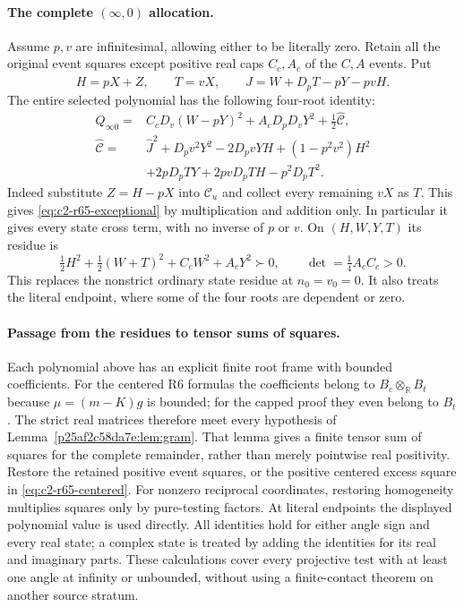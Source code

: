 \paragraph{The complete $(\infty,0)$ allocation.}
Assume $p,v$ are infinitesimal, allowing either to be literally zero.
Retain all the original event squares except positive real caps
$C_c,A_c$ of the $C,A$ events. Put
\[
 H=pX+Z,\qquad T=vX,\qquad
 \widehat J=W+D_pT-pY-pvH.
\]
The entire selected polynomial has the following four-root identity:
\begin{equation}\label{eq:c2-r65-exceptional}
\begin{split}
 Q_{\infty0}={}&C_cD_v(W-pY)^2+A_cD_pD_vY^2
                      +\tfrac12\widehat{\mathcal C},\\
 \widehat{\mathcal C}={}&\widehat J^2+D_pv^2Y^2-2D_pvYH
          +(1-p^2v^2)H^2\\
 &+2pD_pTY+2pvD_pTH-p^2D_pT^2.
\end{split}
\end{equation}
Indeed substitute $Z=H-pX$ into $\mathcal C_u$ and collect every
remaining $vX$ as $T$. This gives
\eqref{eq:c2-r65-exceptional} by multiplication and addition only.
In particular it gives every state cross term, with no inverse of
$p$ or $v$. On $(H,W,Y,T)$ its residue is
\[
 \tfrac12H^2+\tfrac12(W+T)^2+C_cW^2+A_cY^2\succ0,
 \qquad \det=\tfrac14A_cC_c>0.
\]
This replaces the nonstrict ordinary state residue at $n_0=v_0=0$.
It also treats the literal endpoint, where some of the four roots
are dependent or zero.

\paragraph{Passage from the residues to tensor sums of squares.}
Each polynomial above has an explicit finite root frame with bounded
coefficients. For the centered R6 formulas the coefficients belong to
$B_c\otimes_{\mathbb R}B_t$ because $\mu=(m-K)g$ is bounded;
for the capped proof they even belong to $B_t$. The strict real
matrices therefore meet every hypothesis of
Lemma~\ref{p25af2c58da7e:lem:gram}. That lemma gives a finite tensor
sum of squares for the complete remainder, rather than merely
pointwise real positivity. Restore the retained positive event
squares, or the positive centered excess square in
\eqref{eq:c2-r65-centered}. For nonzero reciprocal coordinates,
restoring homogeneity multiplies squares only by pure-testing
factors. At literal endpoints the displayed polynomial value is
used directly. All identities hold for either angle sign and every
real state; a complex state is treated by adding the identities for
its real and imaginary parts. These calculations cover every
projective test with at least one angle at infinity or unbounded,
without using a finite-contact theorem on another source stratum.

